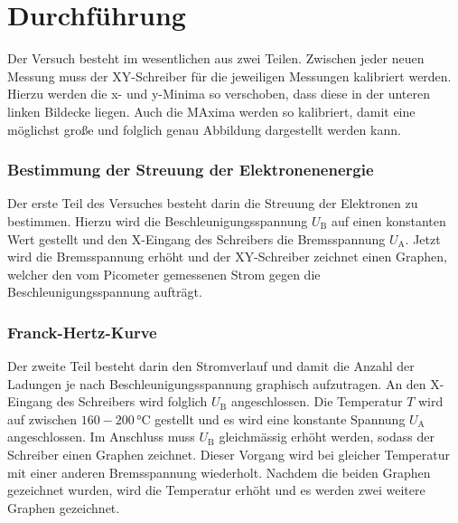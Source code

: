\section{Durchführung}
\label{sec:Durchführung}
Der Versuch besteht im wesentlichen aus zwei Teilen. Zwischen jeder neuen Messung muss der XY-Schreiber für die jeweiligen Messungen kalibriert werden.
Hierzu werden die x- und y-Minima so verschoben, dass diese in der unteren linken Bildecke liegen. Auch die MAxima werden so kalibriert, damit eine möglichst große und folglich genau Abbildung dargestellt werden kann.

\subsubsection{Bestimmung der Streuung der Elektronenenergie}
\label{sec:Bestimmung der Streuung der Elektronenenergie}
Der erste Teil des Versuches besteht darin die Streuung der Elektronen zu bestimmen.
Hierzu wird die Beschleunigungsspannung $U_{\text{B}}$ auf einen konstanten Wert gestellt und den X-Eingang des Schreibers die Bremsspannung $U_{\text{A}}$.
Jetzt wird die Bremsspannung erhöht und der XY-Schreiber zeichnet einen Graphen, welcher den vom Picometer gemessenen Strom gegen die Beschleunigungsspannung aufträgt.

\subsubsection{Franck-Hertz-Kurve}
\label{sec:Franck-Hertz-Kurve}
Der zweite Teil besteht darin den Stromverlauf und damit die Anzahl der Ladungen je nach Beschleunigungsspannung graphisch aufzutragen.
An den X-Eingang des Schreibers wird folglich $U_{\text{B}}$ angeschlossen. Die Temperatur $T$ wird auf zwischen $160-200\, \unit{\celsius}$ gestellt und es wird eine konstante Spannung $U_{\text{A}}$ angeschlossen.
Im Anschluss muss $U_{\text{B}}$ gleichmässig erhöht werden, sodass der Schreiber einen Graphen zeichnet. Dieser Vorgang wird bei gleicher Temperatur mit einer anderen Bremsspannung wiederholt.
Nachdem die beiden Graphen gezeichnet wurden, wird die Temperatur erhöht und es werden zwei weitere Graphen gezeichnet.


